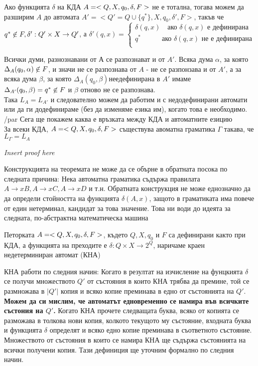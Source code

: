 \documentclass[11pt]{article} %
\begin{document}
Ако функцията $\delta$ на КДА $A = <Q, X, q_{0}, \delta, F>$ не е тотална, тогава можем да разширим $A$ до автомата 
$A' = < Q' = Q \cup \{q^{*}\}, X, q_{0}, \delta', F>$, такъв че 
$q^{*} \centernot\in F, \delta' : Q' \times X \to Q'$, а
$\delta'(q, x) = 
	\begin{cases}
		\delta(q,x) \quad \text{ако } \delta(q,x) 
		\text{ е дефинирана}\\
		q^{*} \quad \quad \quad \text{ако } \delta(q,x)
		\text{ не е дефинирана} \\
	\end{cases}$\par
Всички думи, разнознавани от $А$ се разпознават и от $A'$. Всяка дума $\alpha$, за която 
$\Delta_{A}(q_{0},\alpha) \notBelongsTo F$, и значи не се разпознава от $A$ - не се разпонзава и от $A'$, а за всяка дума $\beta$, за която 
$\Delta_{A}(q_{0}, \beta) не е дефинирана$ в $A'$ имаме
$\Delta_{A'}(q_{0}, \beta) = q^{*} \notBelongsTo F$ и $\beta$ отново не се разпознава. \\
Така $L_{A} = L_{A'}$ и следователно можем да работим и с недодефинирани автомати или да ги додефинираме (без да изменяме езика им), когато това е необходимо. /par
Сега ще покажем каква е връзката между КДА и автоматните езицию\\
 За всеки КДА, $A = <Q, X, q_{0}, \delta, F>$ съществува авоматна граматика $\Gamma$ такава, че $L_{\Gamma} = L_{A}$\\

\centerline{\emph{Insert proof here}} \par

Конструкцията на теоремата не може да се обърне в обратната посока по следната причина: Нека автоматна граматика съдържа правилата $A \to xB, A \to xC, A \to xD$ и т.н. Обратната конструкция не може еднозначно да да определи стойността на функцията $\delta(A, x)$, защото в граматиката има повече от един нетерминал, кандидат за това значение. Това ни води до идеята за следната, по-абстрактна математическа машина

 Петорката $A = <Q, X, q_{0}, \delta, F>$, където $Q, X, q_{0}$ и $F$ са дефинирани както при КДА, а функцията на преходите е $\delta : Q \times X \to 2^{Q}$, наричаме краен недетерминиран автомат (КНА) \par

КНА работи по следния начин: Когато в резултат на изчисление на фунцкията $\delta$ се получи множеството $Q'$ от състояния в които КНА трябва да премине, той се размножава в $|Q'|$ копия и всяко копие преминава в едно от състоянията на $Q'$. \textbf{Можем да си мислим, че автоматът едновременно се намира във всичките състония на $Q'$.} Когато КНА прочете следващата буква, всяко от копията се разможава в толкова нови копия, колкото текущото му състояние, входната буква и функцията $\delta$ определят и всяко едно копие преминава в съответното състояние. Множеството от състояния в които се намира КНА ще съдържа състоянията на всички получени копия. Тази дефиниция ще уточним формално по следния начин. \par
\end{document}
